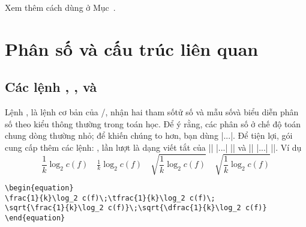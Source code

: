 \documentclass[11pt,leqno,titlepage,openany,oneside]{amsldoc}[1999/12/13]
\begin{document}
\medskip
Xem thêm cách dùng  ở Mục~.

\section{Phân số và cấu trúc liên quan}

\subsection{Các lệnh , , và }

Lệnh , là lệnh cơ bản của \latex/, nhận hai tham số\mdash tử số
và mẫu số\mdash và biểu diễn phân số theo kiểu thông thường trong toán học.
Để ý rằng, các phân số ở chế độ toán chung dòng thường nhỏ; để khiến chúng
to hơn, bạn dùng |\displaystyle\frac...|. Để tiện lợi,
gói  cung cấp thêm các lệnh: ,  lần lượt
là dạng viết tắt của |{\displaystyle\frac| |...| |}| và
|{\textstyle\frac| |...| |}|. Ví dụ
\begin{equation}
\frac{1}{k}\log_2 c(f)\quad\tfrac{1}{k}\log_2 c(f)\quad
\sqrt{\frac{1}{k}\log_2 c(f)}\quad\sqrt{\dfrac{1}{k}\log_2 c(f)}
\end{equation}
\begin{verbatim}
\begin{equation}
\frac{1}{k}\log_2 c(f)\;\tfrac{1}{k}\log_2 c(f)\;
\sqrt{\frac{1}{k}\log_2 c(f)}\;\sqrt{\dfrac{1}{k}\log_2 c(f)}
\end{equation}
\end{verbatim}

\end{document}
